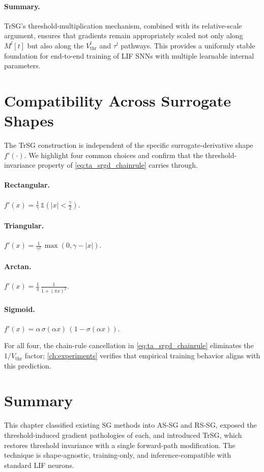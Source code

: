 \paragraph{Summary.}
TrSG's threshold-multiplication mechanism, combined with its relative-scale argument, ensures that gradients remain appropriately scaled not only along $M^{l}[t]$ but also along the $V^{l}_{\text{thr}}$ and $\tau^{l}$ pathways. This provides a uniformly stable foundation for end-to-end training of LIF SNNs with multiple learnable internal parameters.

\section{Compatibility Across Surrogate Shapes}
\label{sec:trsg_compatibility}

The TrSG construction is independent of the specific surrogate-derivative shape $f'(\cdot)$. We highlight four common choices and confirm that the threshold-invariance property of \cref{eq:ta_srgd_chainrule} carries through.

\paragraph{Rectangular.}
$f'(x) = \tfrac{1}{\gamma}\,\mathds{1}(|x|<\tfrac{\gamma}{2})$.

\paragraph{Triangular.}
$f'(x) = \tfrac{1}{\gamma^{2}}\,\max(0,\gamma-|x|)$.

\paragraph{Arctan.}
$f'(x) = \tfrac{1}{\pi}\,\tfrac{1}{1+(\pi x)^{2}}$.

\paragraph{Sigmoid.}
$f'(x) = \alpha\,\sigma(\alpha x)\,(1-\sigma(\alpha x))$.

For all four, the chain-rule cancellation in \cref{eq:ta_srgd_chainrule} eliminates the $1/V_{\text{thr}}$ factor; \cref{ch:experiments} verifies that empirical training behavior aligns with this prediction.

\section{Summary}
\label{sec:trsg_summary}

This chapter classified existing SG methods into AS-SG and RS-SG, exposed the threshold-induced gradient pathologies of each, and introduced TrSG, which restores threshold invariance with a single forward-path modification. The technique is shape-agnostic, training-only, and inference-compatible with standard LIF neurons.
